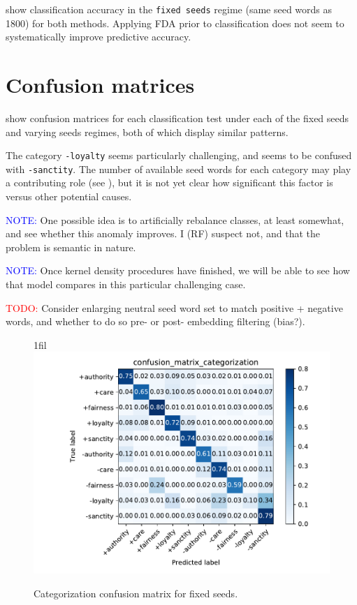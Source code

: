\documentclass{article}
\makeatletter
\newcommand*{\centerfloat}{%
  \parindent \z@
  \leftskip \z@ \@plus 1fil \@minus \textwidth
  \rightskip\leftskip
  \parfillskip \z@skip}
\makeatother
\begin{document}
 show classification
accuracy in the \texttt{fixed seeds} regime (same seed words as 1800) for both
methods. Applying FDA prior to classification does not seem to systematically
improve predictive accuracy.

\section{Confusion matrices}

show confusion matrices for each classification test under each of the
fixed seeds and varying seeds regimes, both of which display similar patterns.

The category \texttt{-loyalty} seems particularly challenging, and seems to
be confused with \texttt{-sanctity}. The number of available seed words for
each category may play a contributing role (see ), but it is not
yet clear how significant this factor is versus other potential causes.

\textcolor{blue}{NOTE:}
One possible idea is to artificially rebalance classes, at least somewhat,
and see whether this anomaly improves. I (RF) suspect not, and that the
problem is semantic in nature.

\textcolor{blue}{NOTE:}
Once kernel density procedures have finished, we will be able to see how
that model compares in this particular challenging case.

\textcolor{red}{TODO:}
Consider enlarging neutral seed word set to match positive + negative words,
and whether to do so pre- or post- embedding filtering (bias?).

\begin{figure}[H]
    \centerfloat
    \includegraphics[width=1.5\linewidth]{confusion-matrix-centroid-fixed-seeds/confusion_matrix_categorization.pdf}
    \caption{Categorization confusion matrix for fixed seeds.}
    \label{fig:confusion-categorization-fixed}
\end{figure}
\end{document}
